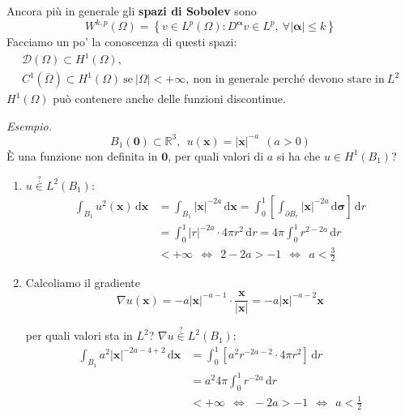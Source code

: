 \documentclass[10pt,a4paper,twoside,openright]{book}
\newcommand{\x}{\mathbf{x}}
\newcommand{\zer}{\mathbf{0}}
\newcommand{\sigg}{\bm{\sigma}}
\newcommand{\de}{\,\mathrm d}
\newcommand{\dr}{\de r}
\newcommand{\dxx}{\de \x}
\newcommand{\dsig}{\de \sigg}
\begin{document}
Ancora più in generale gli \textbf{spazi di Sobolev} sono
\begin{equation*}
	W^{k,p}(\Omega) =\left\{v\in L^{p}(\Omega) :D^{\bm{\alpha}} v\in L^{p} ,\ \forall | \bm{\alpha}| \leqslant k\right\}
\end{equation*}
Facciamo un po' la conoscenza di questi spazi:
\begin{gather*}
	\mathcal{D}(\Omega) \subset H^{1}(\Omega) ,\\
	C^{1}(\overline{\Omega }) \subset H^{1}(\Omega) \ \text{se} \ | \Omega | < +\infty ,\ \text{non in generale perché devono stare in} \ L^{2}
\end{gather*}
$H^{1}(\Omega)$ può contenere anche delle funzioni discontinue.

\textit{Esempio.}
\begin{equation*}
	B_{1}(\zer) \subset \mathbb{R}^{3} ,\ \ u(\x) =| \x| ^{-a} \ \ (a >0)
\end{equation*}
È una funzione non definita in $\zer$, per quali valori di $a$ si ha che $u\in H^{1}(B_{1})$?
\begin{enumerate}
	\item $u\overset{?}{\in } L^{2}(B_{1}) :$
	\begin{align*}
	      \int _{B_{1}} u^{2}(\x) \dxx & =\int _{B_{1}}| \x| ^{-2a} \dxx =\int ^{1}_{0}\left[\int _{\partial B_{r}}| \x| ^{-2a} \dsig \right] \dr\\
	      & =\int ^{1}_{0}| r| ^{-2a} \cdotp 4\pi r^{2} \dr=4\pi \int ^{1}_{0} r^{2-2a} \dr\\
	      & < +\infty \ \ \Leftrightarrow \ \ 2-2a >-1\ \ \Leftrightarrow \ \ a< \frac{3}{2}
	\end{align*}
	\item Calcoliamo il gradiente
	\begin{equation*}
	      \nabla u(\x) =-a| \x| ^{-a-1} \cdotp \frac{\x}{| \x| } =-a| \x| ^{-a-2}\x
	\end{equation*}
	
	per quali valori sta in $L^{2}$? $\nabla u\overset{?}{\in } L^{2}(B_{1}) :$
	\begin{align*}
	\int _{B_{1}} a^{2}| \x| ^{-2a-4+2} \dxx & =\int ^{1}_{0}\left[ a^{2} r^{-2a-2} \cdotp 4\pi r^{2}\right] \dr\\
	& =a^{2} 4\pi \int ^{1}_{0} r^{-2a} \dr\\
	& < +\infty \ \ \Leftrightarrow \ \ -2a >-1\ \ \Leftrightarrow \ \ a< \frac{1}{2}
	\end{align*}
\end{enumerate}
\end{document}
